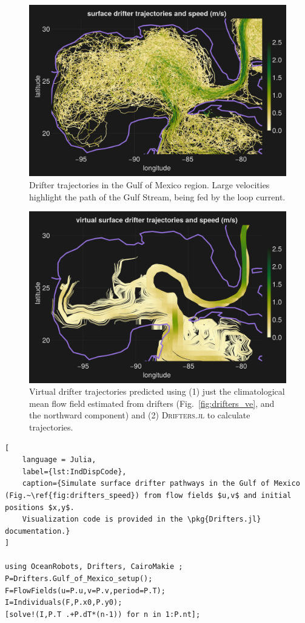 \documentclass{juliacon}[12pt]
\newcommand{\pkg}[1]{{\small \textsc{#1}}}
\begin{document}
\begin{figure}[t]
\centerline{\includegraphics[width=\columnwidth]{figs/20240528_speed_subset.png}}
\caption{Drifter trajectories in the Gulf of Mexico region. Large velocities highlight the path of the Gulf Stream, being fed by the loop current.}
\label{fig:drifters_speed}
\end{figure}

\begin{figure}[t]
\centerline{\includegraphics[width=\columnwidth]{figs/20240529_speed_subset_IndDisp.png}}
\caption{Virtual drifter trajectories predicted using (1) just the climatological mean flow field estimated from drifters (Fig.~\ref{fig:drifters_ve}, and the northward component) and (2) \pkg{Drifters.jl} to calculate trajectories.}
\label{fig:drifters_speed_simu}
\end{figure}


\begin{lstlisting}[
    language = Julia,
    label={lst:IndDispCode},
    caption={Simulate surface drifter pathways in the Gulf of Mexico (Fig.~\ref{fig:drifters_speed}) from flow fields $u,v$ and initial positions $x,y$. 
    Visualization code is provided in the \pkg{Drifters.jl} documentation.}
]

using OceanRobots, Drifters, CairoMakie ;
P=Drifters.Gulf_of_Mexico_setup();
F=FlowFields(u=P.u,v=P.v,period=P.T);
I=Individuals(F,P.x0,P.y0);
[solve!(I,P.T .+P.dT*(n-1)) for n in 1:P.nt];
\end{lstlisting}
\end{document}
